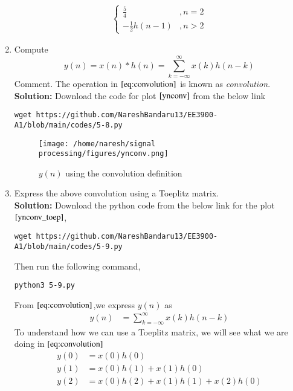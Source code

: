 \documentclass[journal,12pt,twocolumn]{IEEEtran}
\renewcommand\thesection{\arabic{section}}
\newcommand{\solution}{\noindent \textbf{Solution: }}
\providecommand{\brak}[1]{\ensuremath{\left(#1\right)}}
\numberwithin{equation}{section}
\renewcommand\thesection{\arabic{section}}
\begin{document}
\begin{enumerate}[label=\thesection.\arabic*]
\begin{align}
\begin{cases}
                        \frac{5}{4} &, n =2\\
                        -\frac{1}{2}h\brak{n-1} &, n >2
         \end{cases}
         \end{align}
        \item Compute 
     \begin{equation}
     \label{eq:convolution}
     y(n) = x(n)*h(n) = \sum_{k=-\infty}^{\infty}x(k)h(n-k)
     \end{equation}
     Comment. The operation in $\eqref{eq:convolution}$ is known as
     {\em convolution}.\\
     \solution Download the code for plot $\ref{ynconv}$ from the below link
      \begin{lstlisting}
wget https://github.com/NareshBandaru13/EE3900-A1/blob/main/codes/5-8.py
      \end{lstlisting}
      \begin{figure}[ht!]
        \centering
        \texttt{[image: /home/naresh/signal processing/figures/ynconv.png]}
        \caption{$y(n)$ using the convolution definition}
        \label{ynconv}
      \end{figure}
    \item Express the above convolution using a Toeplitz matrix.\\
    \solution Download the python code from the below link for the plot $\ref{ynconv_toep}$,
     \begin{lstlisting}
wget https://github.com/NareshBandaru13/EE3900-A1/blob/main/codes/5-9.py
     \end{lstlisting}
    Then run the following command,
     \begin{lstlisting}
python3 5-9.py
     \end{lstlisting}
    From $\eqref{eq:convolution}$,we express $y\brak{n}$ as
     \begin{align}
       y\brak{n} &= \sum_{k = -\infty}^{\infty}x\brak{k}h\brak{n-k}
     \end{align}
    To understand how we can use a Toeplitz matrix, we will see what we are doing in $\eqref{eq:convolution}$ 
     \begin{align}
      y\brak{0} &= x\brak{0}h\brak{0}\\
      y\brak{1} &= x\brak{0}h\brak{1} + x\brak{1}h\brak{0}\\
      y\brak{2} &= x\brak{0}h\brak{2} + x\brak{1}h\brak{1} + x\brak{2}h\brak{0}\\

\end{align}
\end{enumerate}
\end{document}

